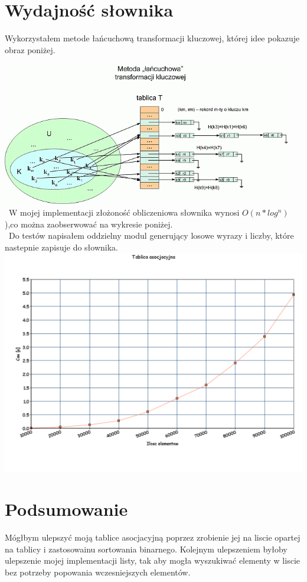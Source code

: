 \documentclass[11pt]{article}
\begin{document}
\section{Wydajność słownika}
Wykorzystałem metode łańcuchową transformacji kluczowej, której idee pokazuje obraz poniżej.
\par\vspace{\baselineskip}
\includegraphics[width=5in]{lancuchowa.png}\\\
W mojej implementacji złożoność obliczeniowa słownika wynosi $O(n*log^n)$),co można zaobserwować na wykresie poniżej.\\\
Do testów napisałem oddzielny modul generujący losowe wyrazy i liczby, które nastepnie zapisuje do słownika.
\includegraphics[width=6in]{slownik.png}


\section{Podsumowanie}
Mógłbym ulepszyć moją tablice asocjacyjną poprzez zrobienie jej na liscie opartej na tablicy i zastosowainu sortowania binarnego.
Kolejnym ulepszeniem byłoby ulepszenie mojej implementacji listy, tak aby mogła wyszukiwać elementy w liscie bez potrzeby popowania wczesniejszych elementów.
\end{document}
